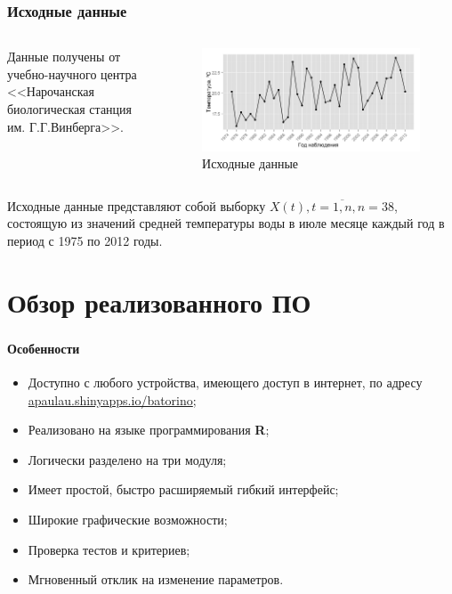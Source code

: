 \documentclass[notheorems]{beamer}
\theoremstyle{definition}
\theoremstyle{example}
\theoremstyle{plain}
\begin{document}
\begin{frame}
  \frametitle{Исходные данные}
  \begin{columns}[c]
  Данные получены от учебно-научного центра <<Нарочанская биологическая станция им. Г.Г.Винберга>>.

  \begin{figure}[h]
    \includegraphics[width=1\linewidth]{../../figures/source.png}
    \caption{Исходные данные}
  \end{figure}
  \end{columns}
  
  \vspace{1em}
  
  Исходные данные представляют собой выборку $ X(t), t = \overline{1,n}, n = 38 $, состоящую из значений средней температуры воды в июле месяце каждый год в период с 1975 по 2012 годы.
\end{frame}

\section{Обзор реализованного ПО}

\begin{frame}
  \frametitle{\large\secname}
  \framesubtitle{Особенности}
  \begin{itemize}
    \item Доступно с любого устройства, имеющего доступ в интернет, по адресу \href{https://apaulau.shinyapps.io/batorino}{apaulau.shinyapps.io/batorino};
    \item Реализовано на языке программирования \textbf{R};
    \item Логически разделено на три модуля;
    \item Имеет простой, быстро расширяемый гибкий интерфейс;
    \item Широкие графические возможности;
    \item Проверка тестов и критериев;
    \item Мгновенный отклик на изменение параметров.
  \end{itemize}
\end{frame}
\end{document}
